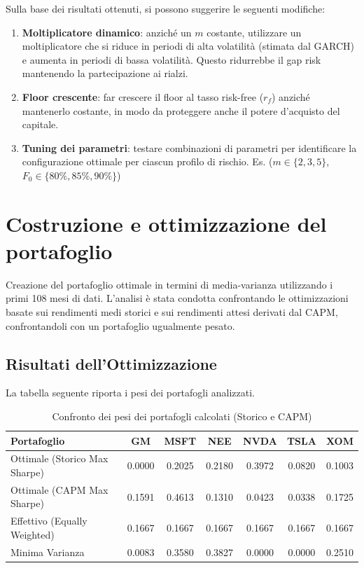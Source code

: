 \documentclass[11pt, a4paper]{report} %
\begin{document}
Sulla base dei risultati ottenuti, si possono suggerire le seguenti modifiche:
\begin{enumerate}
    \item \textbf{Moltiplicatore dinamico}: anziché un $m$ costante, utilizzare un moltiplicatore che si riduce in periodi di alta volatilità (stimata dal GARCH) e aumenta in periodi di bassa volatilità.  Questo ridurrebbe il gap risk mantenendo la partecipazione ai rialzi.
    \item \textbf{Floor crescente}: far crescere il floor al tasso risk-free ($r_f$) anziché mantenerlo costante, in modo da proteggere anche il potere d'acquisto del capitale.
    \item \textbf{Tuning dei parametri}: testare combinazioni di parametri per identificare la configurazione ottimale per ciascun profilo di rischio. Es. ($m \in \{2, 3, 5\}$, $F_0 \in \{80\%, 85\%, 90\%\}$)
\end{enumerate}

\chapter{Costruzione e ottimizzazione del portafoglio}

Creazione del portafoglio ottimale in termini di media-varianza utilizzando i primi 108 mesi di dati. L'analisi è stata condotta confrontando le ottimizzazioni basate sui rendimenti medi storici e sui rendimenti attesi derivati dal CAPM, confrontandoli con un portafoglio ugualmente pesato.

\section{Risultati dell'Ottimizzazione}

La tabella seguente riporta i pesi dei portafogli analizzati.

\begin{table}[H]
\centering
\begin{tabular}{lcccccc}
\hline
\textbf{Portafoglio} & \textbf{GM} & \textbf{MSFT} & \textbf{NEE} & \textbf{NVDA} & \textbf{TSLA} & \textbf{XOM} \\
\hline
Ottimale (Storico Max Sharpe) & 0.0000 & 0.2025 & 0.2180 & 0.3972 & 0.0820 & 0.1003 \\
Ottimale (CAPM Max Sharpe)    & 0.1591 & 0.4613 & 0.1310 & 0.0423 & 0.0338 & 0.1725 \\
Effettivo (Equally Weighted)   & 0.1667 & 0.1667 & 0.1667 & 0.1667 & 0.1667 & 0.1667 \\
Minima Varianza     & 0.0083 & 0.3580 & 0.3827 & 0.0000 & 0.0000 & 0.2510 \\
\hline
\end{tabular}
\caption{Confronto dei pesi dei portafogli calcolati (Storico e CAPM)}
\end{table}
\end{document}
